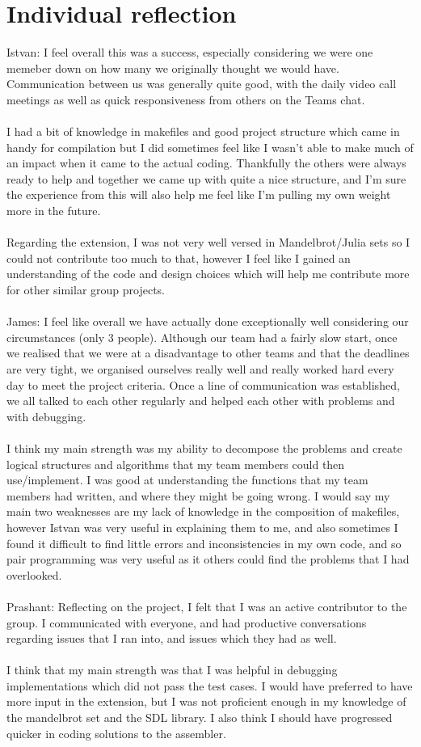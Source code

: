 \documentclass[11pt]{article}
\begin{document}
\section{Individual reflection}
Istvan: I feel overall this was a success, especially considering we were one 
memeber down on how many we originally thought we would have. Communication 
between us was generally quite good, with the daily video call meetings as well 
as quick responsiveness from others on the Teams chat.
\\~\\
I had a bit of knowledge in makefiles and good project structure which came in
handy for compilation but I did sometimes feel like I wasn't able to make much
of an impact when it came to the actual coding. Thankfully the others were 
always ready to help and together we came up with quite a nice structure, and
I'm sure the experience from this will also help me feel like I'm pulling my own
weight more in the future.
\\~\\
Regarding the extension, I was not very well versed in Mandelbrot/Julia sets so
I could not contribute too much to that, however I feel like I gained an
understanding of the code and design choices which will help me contribute more
for other similar group projects.
\\~\\ 
James: I feel like overall we have actually done exceptionally well considering
our circumstances (only 3 people). Although our team had a fairly slow start,
once we realised that we were at a disadvantage to other teams and that the deadlines
are very tight, we organised ourselves really well and really worked hard every
day to meet the project criteria. Once a line of communication was established,
we all talked to each other regularly and helped each other with problems and with
debugging.
\\~\\
I think my main strength was my ability to decompose the problems and create logical
structures and algorithms that my team members could then use/implement. I was 
good at understanding the functions that my team members had written, and where
they might be going wrong. I would say my main two weaknesses are my lack of 
knowledge in the composition of makefiles, however Istvan was very useful in explaining
them to me, and also sometimes I found it difficult to find little errors and
inconsistencies in my own code, and so pair programming was very useful as it 
others could find the problems that I had overlooked.
\\~\\ 
Prashant: Reflecting on the project, I felt that I was an active contributor 
to the group. I communicated with everyone, and had productive conversations 
regarding issues that I ran into, and issues which they had as well.
\\~\\
I think that my main strength was that I was helpful in debugging implementations
which did not pass the test cases. I would have preferred to have more input in 
the extension, but I was not proficient enough in my knowledge of the mandelbrot
set and the SDL library. I also think I should have progressed quicker 
in coding solutions to the assembler.
\end{document}
